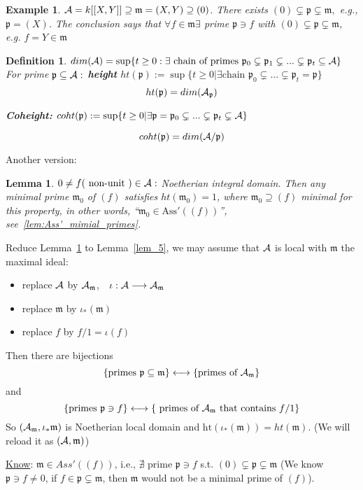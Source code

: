 \documentclass[11pt]{article}
\newtheorem{lemma}[thm]{Lemma}
\newtheorem{dfn}[thm]{Definition}
\newtheorem{ex}[thm]{Example}
\newcommand{\scm}{{\mathfrak m}}
\newcommand{\scp}{{\mathfrak p}}
\newcommand{\cala}{{\cal A}}
\newcommand{\lrta}{\longrightarrow}
\newcommand{\llrta}{\longleftrightarrow}
\begin{document}
\begin{ex}
$\cala=k[[X,Y]]\supseteq \scm=(X,Y)\supseteq (0)$. There exists $(0)\subsetneq\scp\subsetneq\scm,$ e.g., $\scp=(X)$. The conclusion says that $\forall f\in\scm\exists $ prime $\scp\ni f$ with  $(0)\subsetneq \scp\subsetneq \scm$, e.g. $f=Y\in\scm$
\end{ex}




\begin{dfn}
$dim(\cala)=\sup \{t\geq 0:\exists \text{ chain of primes $\scp_0\subsetneq \scp_1\subsetneq ...\subsetneq \scp_t\subseteq \cala$}\}$\\

For prime $\scp\subseteq \cala:$ \textbf{ height }$ht(\scp):=\sup \{t\geq 0|\exists\text{chain $\scp_0\subsetneq ...\subsetneq \scp_t=\scp$}\}$
$$
ht(\scp)=dim(\cala_\scp)
$$

\textbf{Coheight:} $coht(\scp):=\sup\{t\geq 0|\exists \scp=\scp_0\subsetneq ...\subsetneq \scp_t\subsetneq \cala\}$

$$
coht(\scp)=dim(\cala/\scp)
$$
\end{dfn}
 
Another version:
\begin{lemma}\label{lem_5'}
$0\neq f(\text{ non-unit })\in\cala:$ Noetherian integral domain. Then any minimal prime $\scm_0$ of $(f)$ satisfies $ht(\scm_0)= 1$, where
$\scm_0\supseteq (f)$ minimal for this property, in other words, ``$\scm_0\in \text{Ass}'((f))$'', see~\ref{lem:Ass'_mimial_primes}.
\end{lemma}

Reduce Lemma~\ref{lem_5'} to Lemma~\ref{lem_5}, we may assume that $\cala$ is local with $\scm$ the maximal ideal:
\begin{itemize}
\item replace $\cala$ by $\cala_{\scm}$,\ \  $\iota:\cala\lrta \cala_{\scm}$
\item replace $\scm$ by $\iota_*(\scm)$
\item replace $f$ by $f/1=\iota(f)$
\end{itemize}

Then there are bijections 
$$
\{\text{primes $\scp\subseteq \scm$}\}\llrta \text{\{primes of $\cala_{\scm}$\}}
$$
and  
$$
\{\text{primes $\scp\ni f$}\} \llrta\{\text{ primes of }\cala_{\scm}\text{ that contains } f/1\}
$$
So $(\cala_\scm,\iota_*\scm)$ is Noetherian local domain and $\text{ht}(\iota_*(\scm))=ht(\scm)$. (We will reload it as $(\cala,\scm)$)

\underline{Know}: $\scm\in Ass'((f))$, i.e., $\nexists \text{ prime }\scp\ni f$ s.t. $(0)\subsetneq \scp\subsetneq \scm$ (We know $\scp\ni f\neq 0$, if $f\in\scp\subsetneq\scm$, then $\scm$ would not be a minimal prime of $(f)$).
\end{document}
